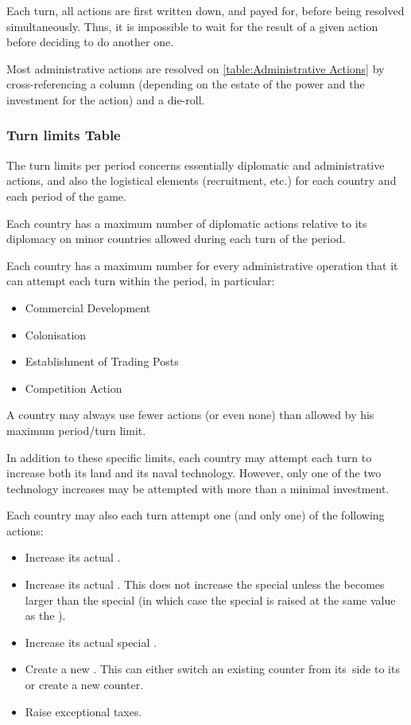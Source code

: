 \aparag Each turn, all actions are first written down, and payed for, before
being resolved simultaneously. Thus, it is impossible to wait for the result
of a given action before deciding to do another one.

\aparag Most administrative actions are resolved on \ref{table:Administrative
  Actions} by cross-referencing a column (depending on the estate of the power
and the investment for the action) and a die-roll.


\subsubsection{Turn limits Table}
\label{chThePowers:Turn Limits}
\aparag The turn limits per period concerns essentially diplomatic and
administrative actions, and also the logistical elements (recruitment, etc.)
for each country and each period of the game.

\aparag[Diplomacy] Each country has a maximum number of diplomatic actions
relative to its diplomacy on minor countries allowed during each turn of the
period.

\aparag[Administration] Each country has a maximum number for every
administrative operation that it can attempt each turn within the period, in
particular:
\begin{itemize}
\item Commercial Development
\item Colonisation
\item Establishment of Trading Posts
\item Competition Action
\end{itemize}

\aparag A country may always use fewer actions (or even none) than allowed by
his maximum period/turn limit.

\aparag[Technology] In addition to these specific limits, each country may
attempt each turn to increase both its land and its naval technology.
\bparag However, only one of the two technology increases may be attempted
with more than a minimal investment.

 Each country may also each turn attempt one (and only
one) of the following actions:
\begin{itemize}
\item Increase its actual \DTI.
\item Increase its actual \FTI. This does not increase the special \FTI unless
  the \FTI becomes larger than the special \FTI (in which case the special
  \FTI is raised at the same value as the \FTI).
\item Increase its actual special \FTI.
\item Create a new \MNU. This can either switch an existing counter from its\
  \facemoins side to its \Faceplus or create a new \Facemoins counter.
\item Raise exceptional taxes.
\end{itemize}

